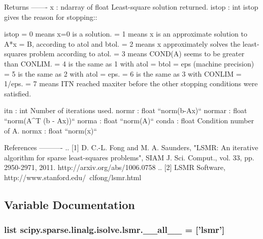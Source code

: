 \begin{DoxyVerb}
Returns
-------
x : ndarray of float
    Least-square solution returned.
istop : int
    istop gives the reason for stopping::

      istop   = 0 means x=0 is a solution.
              = 1 means x is an approximate solution to A*x = B,
                  according to atol and btol.
              = 2 means x approximately solves the least-squares problem
                  according to atol.
              = 3 means COND(A) seems to be greater than CONLIM.
              = 4 is the same as 1 with atol = btol = eps (machine
                  precision)
              = 5 is the same as 2 with atol = eps.
              = 6 is the same as 3 with CONLIM = 1/eps.
              = 7 means ITN reached maxiter before the other stopping
                  conditions were satisfied.

itn : int
    Number of iterations used.
normr : float
    ``norm(b-Ax)``
normar : float
    ``norm(A^T (b - Ax))``
norma : float
    ``norm(A)``
conda : float
    Condition number of A.
normx : float
    ``norm(x)``

References
----------
.. [1] D. C.-L. Fong and M. A. Saunders,
       "LSMR: An iterative algorithm for sparse least-squares problems",
       SIAM J. Sci. Comput., vol. 33, pp. 2950-2971, 2011.
       http://arxiv.org/abs/1006.0758
.. [2] LSMR Software, http://www.stanford.edu/~clfong/lsmr.html\end{DoxyVerb}
 

\subsection{Variable Documentation}
\hypertarget{namespacescipy_1_1sparse_1_1linalg_1_1isolve_1_1lsmr_acfd14ff3ed99383cee3b3455837a4ad4}{}
\subsubsection[{\+\_\+\+\_\+all\+\_\+\+\_\+}]{\setlength{\rightskip}{0pt plus 5cm}list scipy.\+sparse.\+linalg.\+isolve.\+lsmr.\+\_\+\+\_\+all\+\_\+\+\_\+ = \mbox{[}'{\bf lsmr}'\mbox{]}}\label{namespacescipy_1_1sparse_1_1linalg_1_1isolve_1_1lsmr_acfd14ff3ed99383cee3b3455837a4ad4}
